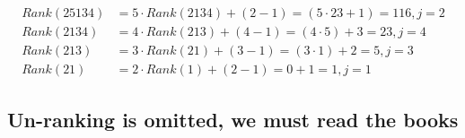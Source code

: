 \documentclass{article}
\begin{document}
\begin{align}
				Rank(25134) &= 5 \cdot Rank(2134) + (2 - 1) = (5 \cdot 23 + 1) = 116, j=2 \\
				Rank(2134) &= 4 \cdot Rank(213) + (4 - 1) = (4 \cdot 5) + 3 = 23, j=4 \\
				Rank(213) &= 3 \cdot Rank(21) + (3 - 1) = (3 \cdot 1) + 2 = 5, j=3 \\
				Rank(21) &= 2 \cdot Rank(1) + (2 - 1) = 0 + 1 = 1, j=1
\end{align}

\subsection*{Un-ranking is omitted, we must read the books}
\end{document}
